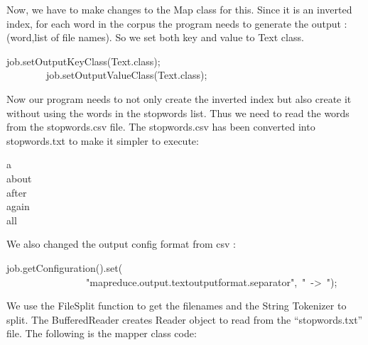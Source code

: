 \documentclass{article}
\begin{document}
\noindent Now, we have to make changes to the Map class for this. Since it is an inverted index, for each word in the corpus
the program needs to generate the output : (word,list of file names).
So we set both key and value to Text class.%
\begin{mdpre}%
\noindent job.setOutputKeyClass(Text.{class});\\
~~~~~~~~job.setOutputValueClass(Text.{class});%
\end{mdpre}\noindent Now our program needs to not only create the inverted index but also create it without using the words in the stopwords list.
Thus we need to read the words from the stopwords.csv file. The stopwords.csv has been converted into stopwords.txt to make it simpler to execute:
\begin{mdpre}%
\noindent a\\
about\\
after\\
again\\
all%
\end{mdpre}\noindent We also changed the output config format from csv :
\begin{mdpre}%
\noindent job.getConfiguration().set(\\
~~~~~~~~~~~~~~~~{"}{mapreduce.output.textoutputformat.separator}{"},~{"}{~-\textgreater{}~}{"});%
\end{mdpre}\noindent We use the FileSplit function to get the filenames and the String Tokenizer to split. The BufferedReader creates Reader object to read from the \textquotedblleft{}stopwords.txt\textquotedblright{} file. The following is the mapper class code:
\end{document}
